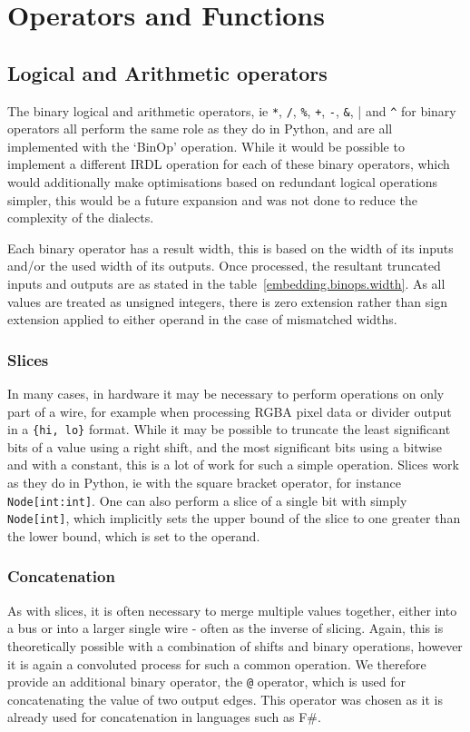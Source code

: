 \section{Operators and Functions}
\subsection{Logical and Arithmetic operators}
The binary logical and arithmetic operators, ie \lstinline|*|, \lstinline|/|, \lstinline|%|, \lstinline|+|, \lstinline|-|, \lstinline|&|, \lstinline||| and \lstinline|^| for binary operators all perform the same role as they do in Python, and are all implemented with the `BinOp' operation. While it would be possible to implement a different IRDL operation for each of these binary operators, which would additionally make optimisations based on redundant logical operations simpler, this would be a future expansion and was not done to reduce the complexity of the dialects.

Each binary operator has a result width, this is based on the width of its inputs and/or the used width of its outputs. Once processed, the resultant truncated inputs and outputs are as stated in the table \ref{embedding.binops.width}. As all values are treated as unsigned integers, there is zero extension rather than sign extension applied to either operand in the case of mismatched widths.

\subsubsection{Slices}
In many cases, in hardware it may be necessary to perform operations on only part of a wire, for example when processing RGBA pixel data or divider output in a \lstinline|{hi, lo}| format. While it may be possible to truncate the least significant bits of a value using a right shift, and the most significant bits using a bitwise and with a constant, this is a lot of work for such a simple operation. Slices work as they do in Python, ie with the square bracket operator, for instance \lstinline|Node[int:int]|. One can also perform a slice of a single bit with simply \lstinline|Node[int]|, which implicitly sets the upper bound of the slice to one greater than the lower bound, which is set to the operand.

\subsubsection{Concatenation}
As with slices, it is often necessary to merge multiple values together, either into a bus or into a larger single wire \hyphen{} often as the inverse of slicing. Again, this is theoretically possible with a combination of shifts and binary operations, however it is again a convoluted process for such a common operation. We therefore provide an additional binary operator, the \lstinline|@| operator, which is used for concatenating the value of two output edges. This operator was chosen as it is already used for concatenation in languages such as F\#.


